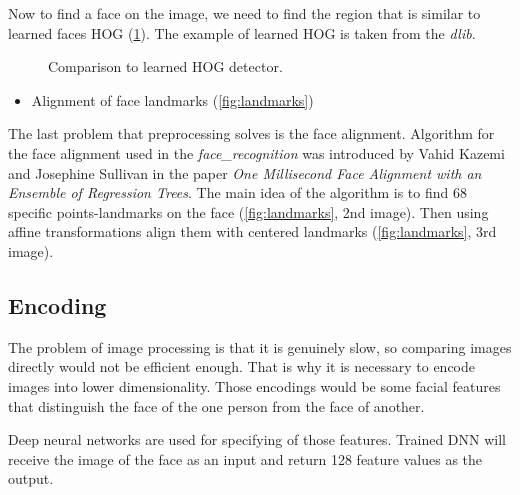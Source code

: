 \documentclass[hidelinks, english]{mvi-report}
\newcommand{\subimage}[3][1]{
\subfigure{
    \texttt{[image: \#2.\#3]}
}
}
\begin{document}
\begin{figure*}[t]
    \centering
    \subimage[0.17]{tilted}{jpg}
    \subimage[0.03]{arrow}{png}
    \subimage[0.17]{landmarks_tilted}{jpg}
    \subimage[0.03]{multiply}{jpg}
    \subimage[0.17]{landmarks}{jpg}
    \subimage[0.03]{arrow}{png}
    \subimage[0.17]{landmarks_aligned}{jpg}
    \caption{Aligned face landmarks.}
    \label{fig:landmarks}
\end{figure*}


Now to find a face on the image, we need to find the region that is similar to learned faces HOG (\cref{fig:detected}).
The example of learned HOG is taken from the \textit{dlib}\cite{generic-hog}.

\begin{figure}[H]
    \centering
    \subimage[0.17]{detected}{jpg}
    \subimage[0.17]{hog_general}{png}
    \caption{Comparison to learned HOG detector.}
    \label{fig:detected}
\end{figure}



\begin{itemize}
\item Alignment of face landmarks (\cref{fig:landmarks})
\end{itemize}

The last problem that preprocessing solves is the face alignment. Algorithm for the face alignment used
in the \textit{face\_recognition} was introduced by Vahid Kazemi and Josephine Sullivan in the paper
\textit{One Millisecond Face Alignment with an Ensemble of Regression Trees}\cite{face-alignment}. The main idea of the
algorithm is to find 68 specific points-landmarks on the face (\cref{fig:landmarks}, 2nd image). Then using affine
transformations align them with centered landmarks (\cref{fig:landmarks}, 3rd image).


\subsection{Encoding}

The problem of image processing is that it is genuinely slow, so comparing images directly would not be efficient
enough. That is why it is necessary to encode images into lower dimensionality. Those encodings would be some facial
features that distinguish the face of the one person from the face of another.

Deep neural networks are used for specifying of those features. Trained DNN will receive the image of the face as
an input and return 128 feature values as the output.
\end{document}
